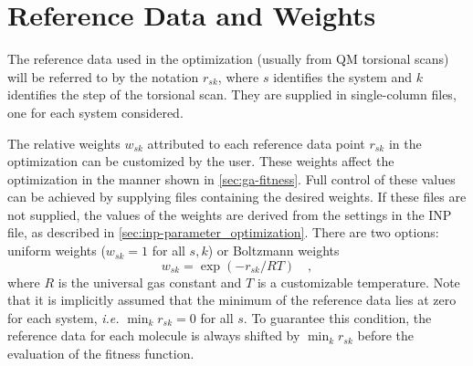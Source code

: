 \documentclass[10pt,a4paper,openany]{memoir}
\numberwithin{equation}{section}
\newcommand{\profileropt}[0]{\texttt{profilerOpt}}
\newcommand{\profilergen}[0]{\texttt{profilerGen}}
\begin{document}
% 
% 

\section{Reference Data and Weights}
\label{sec:ga-fitness-wei}

The reference data used in the optimization (usually from QM torsional
scans) will be referred to by the notation $r_{sk}$, where $s$
identifies the system and $k$ identifies the step of the torsional
scan.  They are supplied in single-column files, one for each system
considered.

The relative weights $w_{sk}$ attributed to each reference data point
$r_{sk}$ in the optimization can be customized by the user.  These
weights affect the optimization in the manner shown in \autoref{sec:ga-fitness}.
Full control of these values can be achieved by
supplying files containing the desired weights. If these files are not supplied, the values
of the weights are derived from the settings in the INP file, as
described in \autoref{sec:inp-parameter_optimization}.  There are two
options: uniform weights ($w_{sk} = 1$ for all $s,k$) or Boltzmann
weights
\begin{equation*}
  w_{sk} = \exp{(-r_{sk}/RT)} \quad , 
\end{equation*}
where $R$ is the universal gas constant and $T$ is a customizable
temperature.  Note that it is implicitly assumed that the minimum of
the reference data lies at zero for each system, \textit{i.e.}
$\min_k{r_{sk}} = 0$ for all $s$.  To guarantee this condition, the
reference data for each molecule is always shifted by $\min_k{r_{sk}}$
before the evaluation of the fitness function.
\end{document}
